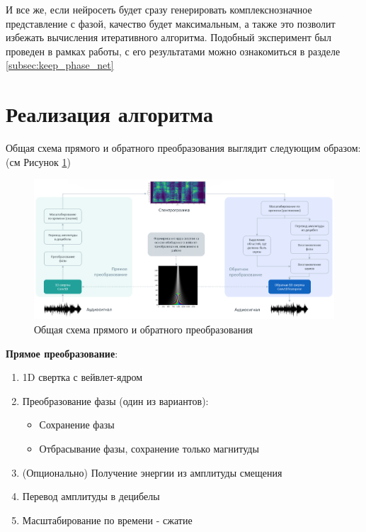 И все же, если нейросеть будет сразу генерировать комплекснозначное представление с фазой, 
качество будет максимальным, а также это позволит избежать вычисления итеративного алгоритма.
Подобный эксперимент был проведен в рамках работы, с его результатами можно ознакомиться в разделе \ref{subsec:keep_phase_net}


\section{Реализация алгоритма}

Общая схема прямого и обратного преобразования выглядит следующим образом: (см Рисунок \ref{fig:algorithm_overview})

\clearpage

\begin{figure}
  \centering
  \includegraphics[width=0.9\linewidth]{figures/algorithm_overview}
  \caption{Общая схема прямого и обратного преобразования}
  \label{fig:algorithm_overview}
\end{figure}

\textbf{Прямое преобразование}:
\begin{enumerate}[1.]
  \item 1D свертка с вейвлет-ядром
  \item Преобразование фазы (один из вариантов):
    \begin{itemize}
      \item Сохранение фазы
      \item Отбрасывание фазы, сохранение только магнитуды
    \end{itemize}
  \item (Опционально) Получение энергии из амплитуды смещения
  \item Перевод амплитуды в децибелы
  \item Масштабирование по времени - сжатие
\end{enumerate}

